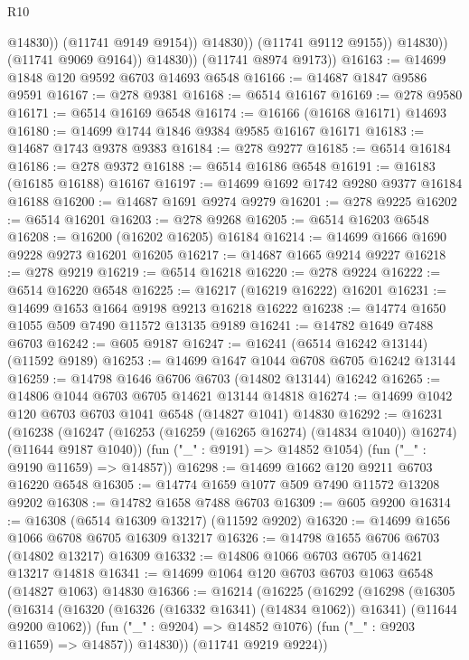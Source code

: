 \begin{lexlean}{R10}
\begin{coremodule}
                            @14830))
                        (@11741 @9149 @9154))
                      @14830))
                  (@11741 @9112 @9155))
                @14830))
            (@11741 @9069 @9164))
          @14830))
      (@11741 @8974 @9173))
@16163 := @14699 @1848 @120 @9592 @6703 @14693 @6548
@16166 := @14687 @1847 @9586 @9591
@16167 := @278 @9381
@16168 := @6514 @16167
@16169 := @278 @9580
@16171 := @6514 @16169 @6548
@16174 := @16166 (@16168 @16171) @14693
@16180 := @14699 @1744 @1846 @9384 @9585 @16167 @16171
@16183 := @14687 @1743 @9378 @9383
@16184 := @278 @9277
@16185 := @6514 @16184
@16186 := @278 @9372
@16188 := @6514 @16186 @6548
@16191 := @16183 (@16185 @16188) @16167
@16197 := @14699 @1692 @1742 @9280 @9377 @16184 @16188
@16200 := @14687 @1691 @9274 @9279
@16201 := @278 @9225
@16202 := @6514 @16201
@16203 := @278 @9268
@16205 := @6514 @16203 @6548
@16208 := @16200 (@16202 @16205) @16184
@16214 := @14699 @1666 @1690 @9228 @9273 @16201 @16205
@16217 := @14687 @1665 @9214 @9227
@16218 := @278 @9219
@16219 := @6514 @16218
@16220 := @278 @9224
@16222 := @6514 @16220 @6548
@16225 := @16217 (@16219 @16222) @16201
@16231 := @14699 @1653 @1664 @9198 @9213 @16218 @16222
@16238 := @14774 @1650 @1055 @509 @7490 @11572 @13135 @9189
@16241 := @14782 @1649 @7488 @6703
@16242 := @605 @9187
@16247 := @16241 (@6514 @16242 @13144) (@11592 @9189)
@16253 := @14699 @1647 @1044 @6708 @6705 @16242 @13144
@16259 := @14798 @1646 @6706 @6703 (@14802 @13144) @16242
@16265 := @14806 @1044 @6703 @6705 @14621 @13144 @14818
@16274 := @14699 @1042 @120 @6703 @6703 @1041 @6548 (@14827 @1041) @14830
@16292 := @16231
    (@16238
      (@16247 (@16253 (@16259 (@16265 @16274) (@14834 @1040)) @16274) (@11644 @9187 @1040))
      (fun ("_" : @9191) => @14852 @1054)
      (fun ("_" : @9190 @11659) => @14857))
@16298 := @14699 @1662 @120 @9211 @6703 @16220 @6548
@16305 := @14774 @1659 @1077 @509 @7490 @11572 @13208 @9202
@16308 := @14782 @1658 @7488 @6703
@16309 := @605 @9200
@16314 := @16308 (@6514 @16309 @13217) (@11592 @9202)
@16320 := @14699 @1656 @1066 @6708 @6705 @16309 @13217
@16326 := @14798 @1655 @6706 @6703 (@14802 @13217) @16309
@16332 := @14806 @1066 @6703 @6705 @14621 @13217 @14818
@16341 := @14699 @1064 @120 @6703 @6703 @1063 @6548 (@14827 @1063) @14830
@16366 := @16214
    (@16225
      (@16292
        (@16298
          (@16305
            (@16314 (@16320 (@16326 (@16332 @16341) (@14834 @1062)) @16341) (@11644 @9200 @1062))
            (fun ("_" : @9204) => @14852 @1076)
            (fun ("_" : @9203 @11659) => @14857))
          @14830))
      (@11741 @9219 @9224))

\end{coremodule}
\end{lexlean}
